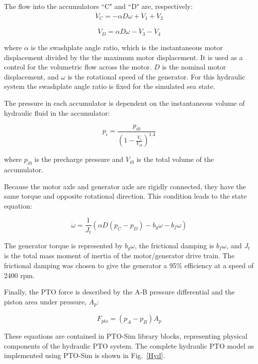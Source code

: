 \documentclass[twocolumn,10pt]{asme2e}
\begin{document}
The flow into the accumulators ``C" and ``D" are, respectively: 
\begin{equation}
\dot{V}_C=-\alpha D \omega+\dot{V}_1+\dot{V}_2 
\end{equation}

\begin{equation}
\dot{V}_D=\alpha D \omega-\dot{V}_3-\dot{V}_4 
\end{equation}

\noindent where $\alpha$ is the swashplate angle ratio, which is the instantaneous motor displacement divided by the the maximum motor displacement. It is used as a control for the volumetric flow across the motor. $D$ is the nominal motor displacement, and $\omega$ is the rotational speed of the generator. 
For this hydraulic system the swashplate angle ratio is fixed for the simulated sea state. 

The pressure in each accumulator is dependent on the instantaneous volume of hydraulic fluid in the accumulator:

\begin{equation}
p_i=\frac{p_{i0}}{(1-\frac{V_i}{V_{i0}})^{1.4}}
\end{equation}

\noindent where $p_{i0}$ is the precharge pressure and $V_{i0}$ is the total volume of the accumulator. 

Because the motor axle and generator axle are rigidly connected, they have the same torque and opposite rotational direction. This condition leads to the state equation:

\begin{equation}
\dot{\omega}=\frac{1}{J_t}(\alpha D (p_C-p_D)-b_g \omega-b_f \omega)
\end{equation}

The generator torque is represented by $b_g$$\omega$, the frictional damping is $b_f$$\omega$, and $J_t$ is the total mass moment of inertia of the motor/generator drive train.  The frictional damping was chosen to give the generator a 95\% efficiency at a speed of 2400 rpm. 

Finally, the PTO force is described by the A-B pressure differential and the piston area under pressure, $A_p$:

\begin{equation}
F_{pto}=(p_A-p_B)A_p
\end{equation}

These equations are contained in PTO-Sim library blocks, representing physical components of the hydraulic PTO system. The complete hydraulic PTO model as implemented using PTO-Sim is shown in Fig.~\ref{Hyd}. 
\end{document}
